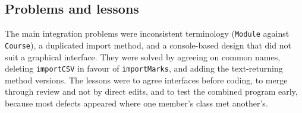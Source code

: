 \subsection{Problems and lessons}
The main integration problems were inconsistent terminology (\texttt{Module} against \texttt{Course}), a duplicated import method, and a console-based design that did not suit a graphical interface. They were solved by agreeing on common names, deleting \texttt{importCSV} in favour of \texttt{importMarks}, and adding the text-returning method versions. The lessons were to agree interfaces before coding, to merge through review and not by direct edits, and to test the combined program early, because most defects appeared where one member's class met another's.

